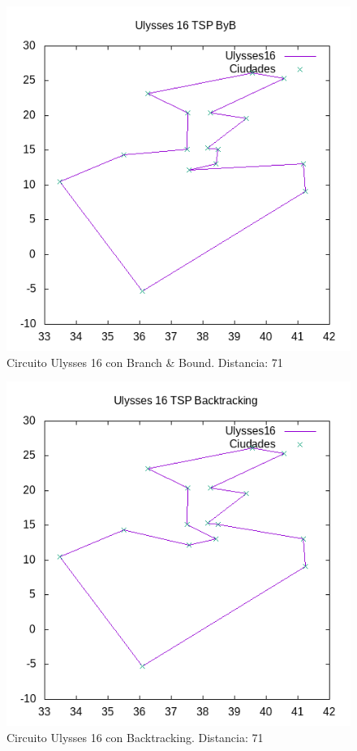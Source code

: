 \documentclass{article}
\begin{document}
	\begin{figure}[H]
		\centering
		\includegraphics[totalheight=6cm]{ulysses16byb}
		\caption{Circuito Ulysses 16 con Branch \& Bound. Distancia: 71}
		\label{fig:u16byb}
	\end{figure}

	\begin{figure}[H]
		\centering
		\includegraphics[totalheight=6cm]{ulysses16back}
		\caption{Circuito Ulysses 16 con Backtracking. Distancia: 71}
		\label{fig:u16back}
	\end{figure}
\end{document}

